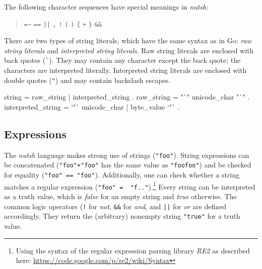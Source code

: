 \documentclass[paper=a4,twoside,abstract=on,cleardoublepage=empty,numbers=noenddot,toc=bib,12pt]{scrreprt}
\begin{document}

The following character sequences have special meanings in \emph{nutsh}:

\begin{quote}
    \texttt{=\~}\hspace{1em}
    \texttt{==}\hspace{1em}
    \texttt{||}\hspace{1em}
    \texttt{,}\hspace{1em}
    \texttt{!}\hspace{1em}
    \texttt{(}\hspace{1em}
    \texttt{)}\hspace{1em}
    \texttt{\{}\hspace{1em}
    \texttt{+}\hspace{1em}
    \texttt{\}}\hspace{1em}
    \texttt{\&\&}
\end{quote}


There are two types of string literals, which have the same syntax as in Go: \emph{raw string literals} and \emph{interpreted string literals}. Raw string literals are enclosed with back quotes (\texttt{\`}). They may contain any character except the back quote; the characters are interpreted literally. Interpreted string literals are enclosed with double quotes (\texttt{"}) and may contain backslash escapes.

\begin{ebnf}
string = raw_string | interpreted_string .
raw_string = "`" { unicode_char } "`" .
interpreted_string = `"` { unicode_char | byte_value } `"` .
\end{ebnf}

\subsection{Expressions}


The \emph{nutsh} language makes strong use of strings (\texttt{"foo"}). String expressions can be concatenated (\texttt{"foo"+"foo"} has the same value as \texttt{"foofoo"}) and be checked for equality (\texttt{"foo" == "foo"}). Additionally, one can check whether a string matches a regular expression (\texttt{"foo" =~ "f.."}).\footnote{Using the syntax of the regular expression parsing library \emph{RE2} as described here: \url{https://code.google.com/p/re2/wiki/Syntax}} Every string can be interpreted as a truth value, which is \emph{false} for an empty string and \emph{true} otherwise. The common logic operators (\texttt{!} for \emph{not}, \texttt{\&\&} for \emph{and}, and \texttt{||} for \emph{or} are defined accordingly. They return the (arbitrary) nonempty string \texttt{"true"} for a truth value.
\end{document}
